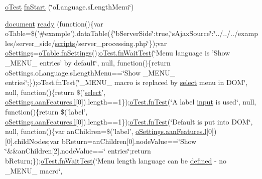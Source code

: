 \begin{DoxyCompactItemize}
\item 
\hyperlink{unit__test_8js_a3b2d259e2df3b6860d9047a92d09d0d6}{o\+Test} \hyperlink{4__server-side_2o_language_8s_length_menu_8js_a4c8d2a8bf9bca1189dc143d965de86b4}{fn\+Start} (\char`\"{}o\+Language.\+s\+Length\+Menu\char`\"{})
\item 
\hyperlink{outside_events_8js_aa14f8e0338cced6720590fd2ea13bd4b}{document} \hyperlink{4__server-side_2o_language_8s_length_menu_8js_a970e2135b3fea85962edcc2e8fc93aeb}{ready} (function()\{var o\+Table=\$('\#example').data\+Table(\{\char`\"{}b\+Server\+Side\char`\"{}\+:true,\char`\"{}s\+Ajax\+Source\char`\"{}\+:\char`\"{}../../../examples/server\+\_\+side/\hyperlink{tinymce_8jquery_8dev_8js_a09066d4d580eeec222f858d588b4cdef}{scripts}/server\+\_\+processing.\+php\char`\"{}\});var \hyperlink{model_8settings_8js_a4857b9c813b4dea010668e9555d0aca7}{o\+Settings}=\hyperlink{api_8methods_8js_a78f387fab92a85c2cb7830bc5d8a6141}{o\+Table.\+fn\+Settings}();\hyperlink{onhold_24__server-side_2__zero__config_8js_ab25c4d596771c0133cdc45178ce72c3d}{o\+Test.\+fn\+Wait\+Test}(\char`\"{}Menu language is 'Show \+\_\+\+M\+E\+N\+U\+\_\+ entries' by default\char`\"{}, null, function()\{return o\+Settings.\+o\+Language.\+s\+Length\+Menu==\char`\"{}Show \+\_\+\+M\+E\+N\+U\+\_\+ entries\char`\"{};\});o\+Test.\+fn\+Test(\char`\"{}\+\_\+\+M\+E\+N\+U\+\_\+ macro is replaced by \hyperlink{validate_8js_a107b4864f70df98ef4a521c0b2bc80c7}{select} menu in D\+O\+M\char`\"{}, null, function()\{return \$('\hyperlink{validate_8js_a107b4864f70df98ef4a521c0b2bc80c7}{select}', \hyperlink{jquery_8data_tables_8min_8js_aae3c400cfa9afd0584b6226ac3804a40}{o\+Settings.\+aan\+Features.\+l}\mbox{[}0\mbox{]}).length==1\});\hyperlink{__zero__config__objects__subarrays_8js_a7f100cfe8617a03cd30c47b5e15396a4}{o\+Test.\+fn\+Test}(\char`\"{}A label \hyperlink{validate_8js_a07a2aabd64594dc36dd810cad2669deb}{input} is used\char`\"{}, null, function()\{return \$('label', \hyperlink{jquery_8data_tables_8min_8js_aae3c400cfa9afd0584b6226ac3804a40}{o\+Settings.\+aan\+Features.\+l}\mbox{[}0\mbox{]}).length==1\});\hyperlink{__zero__config__objects__subarrays_8js_a7f100cfe8617a03cd30c47b5e15396a4}{o\+Test.\+fn\+Test}(\char`\"{}Default is put into D\+O\+M\char`\"{}, null, function()\{var an\+Children=\$('label', \hyperlink{jquery_8data_tables_8min_8js_aae3c400cfa9afd0584b6226ac3804a40}{o\+Settings.\+aan\+Features.\+l}\mbox{[}0\mbox{]})\mbox{[}0\mbox{]}.child\+Nodes;var b\+Return=an\+Children\mbox{[}0\mbox{]}.node\+Value==\char`\"{}Show \char`\"{}\&\&an\+Children\mbox{[}2\mbox{]}.node\+Value==\char`\"{} entries\char`\"{};return b\+Return;\});\hyperlink{onhold_24__server-side_2__zero__config_8js_ab25c4d596771c0133cdc45178ce72c3d}{o\+Test.\+fn\+Wait\+Test}(\char`\"{}Menu length language can be \hyperlink{tinymce_8js_a8cb6212cde9926d156ab5912c9b547cf}{defined} -\/ no \+\_\+\+M\+E\+N\+U\+\_\+ macro\char`\"{}, 
\end{DoxyCompactItemize}
